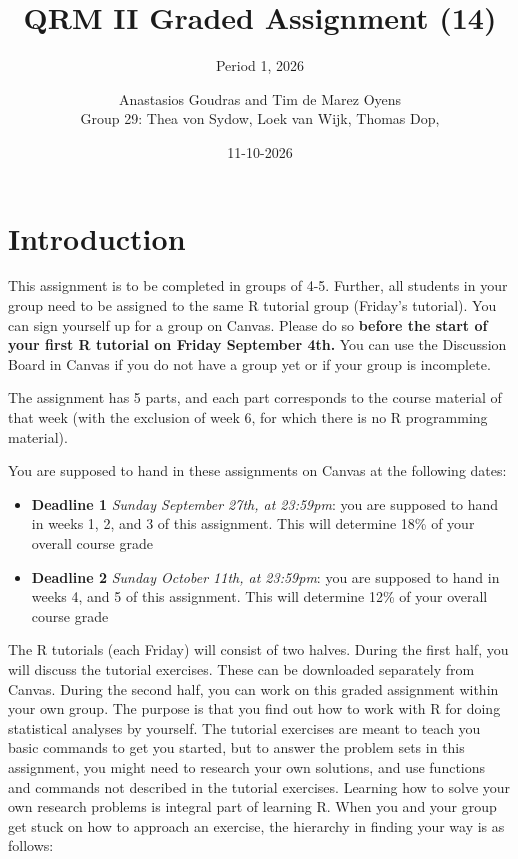 \documentclass[
]{article}
\title{QRM II Graded Assignment (14)}
\subtitle{Period 1, 2026}
\author{Anastasios Goudras and Tim de Marez Oyens\\
Group 29: Thea von Sydow, Loek van Wijk, Thomas Dop,}
\date{11-10-2026}
\providecommand{\tightlist}{%
  \setlength{\itemsep}{0pt}\setlength{\parskip}{0pt}}
\begin{document}
\maketitle

\section{Introduction}\label{introduction}

This assignment is to be completed in groups of 4-5. Further, all
students in your group need to be assigned to the same R tutorial group
(Friday's tutorial). You can sign yourself up for a group on Canvas.
Please do so
\textbf{before the start of your first R tutorial on Friday September 4th.}
You can use the Discussion Board in Canvas if you do not have a group
yet or if your group is incomplete.

The assignment has 5 parts, and each part corresponds to the course
material of that week (with the exclusion of week 6, for which there is
no R programming material).

You are supposed to hand in these assignments on Canvas at the following
dates:

\begin{itemize}
\tightlist
\item
  \textbf{Deadline 1} \emph{Sunday September 27th, at 23:59pm}: you are
  supposed to hand in weeks 1, 2, and 3 of this assignment. This will
  determine 18\% of your overall course grade
\item
  \textbf{Deadline 2} \emph{Sunday October 11th, at 23:59pm}: you are
  supposed to hand in weeks 4, and 5 of this assignment. This will
  determine 12\% of your overall course grade
\end{itemize}

The R tutorials (each Friday) will consist of two halves. During the
first half, you will discuss the tutorial exercises. These can be
downloaded separately from Canvas. During the second half, you can work
on this graded assignment within your own group. The purpose is that you
find out how to work with R for doing statistical analyses by yourself.
The tutorial exercises are meant to teach you basic commands to get you
started, but to answer the problem sets in this assignment, you might
need to research your own solutions, and use functions and commands not
described in the tutorial exercises. Learning how to solve your own
research problems is integral part of learning R. When you and your
group get stuck on how to approach an exercise, the hierarchy in finding
your way is as follows:
\end{document}
